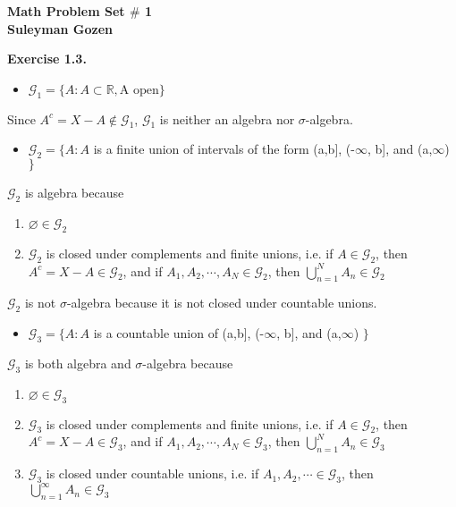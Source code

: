\documentclass[12pt]{article}
\renewcommand{\emptyset}{\varnothing}
\begin{document}
\begin{center}
\textbf{\Large Math Problem Set $\#$ 1} \\
\textbf{Suleyman Gozen}
\end{center}

\textbf{Exercise 1.3.}

\begin{itemize}
\item $\mathcal{G}_{1} = \{A : A \subset \mathbb{R}, \text{A open}\}$
\end{itemize}

Since $A^{c} = X - A \notin \mathcal{G}_{1}$, $\mathcal{G}_{1}$ is neither an algebra nor $\sigma$-algebra.

\begin{itemize}
\item $\mathcal{G}_2 = \{A: A $ is a finite union of intervals of the form (a,b], (-$\infty$, b], and (a,$\infty$) $\}$
\end{itemize}

$\mathcal{G}_2$ is algebra because 

\begin{enumerate}
\item $\emptyset \in \mathcal{G}_2$
\item $\mathcal{G}_2$ is closed under complements and finite unions, i.e. if $A \in  \mathcal{G}_2$, then $A^c = X-A \in  \mathcal{G}_2$, and if $A_1, A_2, \cdots, A_N \in  \mathcal{G}_2$, then $\bigcup_{n=1}^{N} A_n \in  \mathcal{G}_2$
\end{enumerate}

$\mathcal{G}_2$ is not $\sigma$-algebra because it is not closed under countable unions.

\begin{itemize}
\item $\mathcal{G}_3 = \{A: A $ is a countable union of (a,b], (-$\infty$, b], and (a,$\infty$) $\}$
\end{itemize}

$\mathcal{G}_3$ is both algebra and $\sigma$-algebra because 

\begin{enumerate}
\item $\emptyset \in \mathcal{G}_3$
\item $\mathcal{G}_3$ is closed under complements and finite unions, i.e. if $A \in  \mathcal{G}_2$, then $A^c = X-A \in  \mathcal{G}_3$, and if $A_1, A_2, \cdots, A_N \in  \mathcal{G}_3$, then $\bigcup_{n=1}^{N} A_n \in  \mathcal{G}_3$
\item $\mathcal{G}_3$ is closed under countable unions, i.e. if $A_1, A_2, \cdots \in \mathcal{G}_3$, then $\bigcup_{n=1}^{\infty} A_n \in \mathcal{G}_3$
\end{enumerate}
\end{document}
